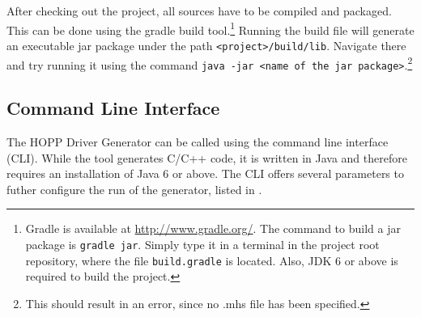 \documentclass{report}
\begin{document}
After checking out the project, all sources have to be compiled and packaged. This can be done using the gradle build tool.\footnote{Gradle is available at \url{http://www.gradle.org/}. The command to build a jar package is \texttt{gradle jar}. Simply type it in a terminal in the project root repository, where the file \texttt{build.gradle} is located. Also, JDK 6 or above is required to build the project.} Running the build file will generate an executable jar package under the path \texttt{<project>/build/lib}. Navigate there and try running it using the command \texttt{java -jar <name of the jar package>}.\footnote{This should result in an error, since no .mhs file has been specified.} 

\subsection{Command Line Interface}
The HOPP Driver Generator can be called using the command line interface (CLI). While the tool generates C/C++ code, it is written in Java and therefore requires an installation of Java 6 or above. The CLI offers several parameters to futher configure the run of the generator, listed in .
\end{document}
